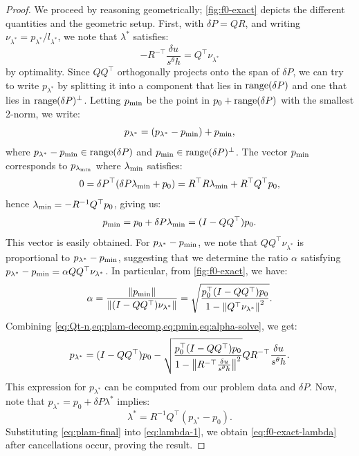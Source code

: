 \documentclass[eikonal.tex]{subfiles}
\begin{document}
\begin{proof}
  We proceed by reasoning geometrically; \cref{fig:f0-exact} depicts
  the different quantities and the geometric setup. First, with
  $\delta P = QR$, and writing $\nu_{\lambda^*} = p_{\lambda^*}/l_{\lambda^*}$, we
  note that $\lambda^*$ satisfies:
  \begin{equation}\label{eq:Qt-n}
    - R^{-\top} \frac{\delta u}{s^\theta h} = Q^\top \nu_{\lambda^*}
  \end{equation}
  by optimality. Since $QQ^\top$ orthogonally projects onto the span
  of $\delta P$, we can try to write $p_{\lambda^*}$ by splitting it
  into a component that lies in $\operatorname{range}(\delta P)$ and one that lies
  in $\operatorname{range}(\delta P)^\perp$. Letting $p_{\operatorname{min}}$ be the point in
  $p_0 + \operatorname{range}(\delta P)$ with the smallest 2-norm, we write:
  \begin{equation}\label{eq:plam-decomp}
    p_{\lambda^*} = (p_{\lambda^*} - p_{\operatorname{min}}) + p_{\operatorname{min}},
  \end{equation}
  where $p_{\lambda^*} - p_{\operatorname{min}} \in \operatorname{range}(\delta P)$ and
  $p_{\operatorname{min}} \in \operatorname{range}(\delta P)^\perp$. The vector $p_{\operatorname{min}}$ corresponds to
  $p_{\lambda_{\operatorname{min}}}$ where $\lambda_{\operatorname{min}}$ satisfies:
  \begin{equation}
    0 = \delta P^\top (\delta P \lambda_{\operatorname{min}} + p_0) = R^\top R \lambda_{\operatorname{min}} + R^\top Q^\top p_0,
  \end{equation}
  hence $\lambda_{\operatorname{min}} = -R^{-1} Q^\top p_0$, giving us:
  \begin{equation}\label{eq:pmin}
    p_{\operatorname{min}} = p_0 + \delta P \lambda_{\operatorname{min}} = {(I - QQ^\top)} p_0.
  \end{equation}
  This vector is easily obtained. For $p_{\lambda^*} - p_{\operatorname{min}}$, we note
  that $QQ^\top \nu_{\lambda^*}$ is proportional to
  $p_{\lambda^*} - p_{\operatorname{min}}$, suggesting that we determine the ratio
  $\alpha$ satisfying
  $p_{\lambda^*} - p_{\operatorname{min}} = \alpha QQ^\top \nu_{\lambda^*}$. In
  particular, from \cref{fig:f0-exact}, we have:
  \begin{equation}\label{eq:alpha-solve}
    \alpha = \frac{\left\|p_{\operatorname{min}}\right\|}{\left\|(I - QQ^\top) \nu_{\lambda^*}\right\|} = \sqrt{\frac{p_0^\top {(I - QQ^\top)} p_0}{1 - \left\|Q^\top \nu_{\lambda^*}\right\|^2}}.
  \end{equation}
  Combining \cref{eq:Qt-n,eq:plam-decomp,eq:pmin,eq:alpha-solve}, we get:
  \begin{equation}\label{eq:plam-final}
    p_{\lambda^*} = {(I - QQ^\top)}p_0 - \sqrt{\frac{p_0^\top {(I - QQ^\top)} p_0}{1 - \left\|R^{-\top} \frac{\delta u}{s^\theta h}\right\|^2}} Q R^{-\top} \frac{\delta u}{s^\theta h}.
  \end{equation}
  This expression for $p_{\lambda^*}$ can be computed from our problem
  data and $\delta P$. Now, note that
  $p_{\lambda^*} = p_0 + \delta P \lambda^*$ implies:
  \begin{equation}\label{eq:lambda-1}
    \lambda^* = R^{-1} Q^\top (p_{\lambda^*} - p_0).
  \end{equation}
  Substituting \cref{eq:plam-final} into \cref{eq:lambda-1}, we obtain
  \cref{eq:f0-exact-lambda} after cancellations occur, proving the
  result.
\end{proof}
\end{document}
